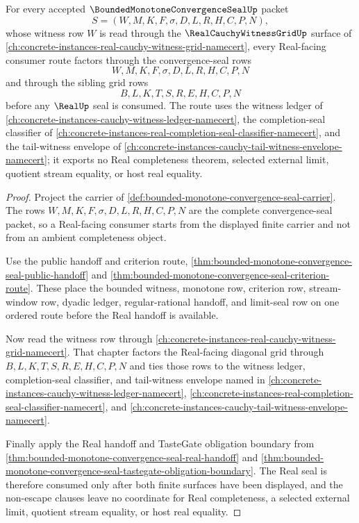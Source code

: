 \begin{theorem}
\label{thm:bounded-monotone-convergence-seal-witness-grid-factorization}
For every accepted $\BoundedMonotoneConvergenceSealUp$ packet
$$
S=(W,M,K,F,\sigma,D,L,R,H,C,P,N),
$$
whose witness row $W$ is read through the $\RealCauchyWitnessGridUp$ surface of \autoref{ch:concrete-instances-real-cauchy-witness-grid-namecert}, every Real-facing consumer route factors through the convergence-seal rows
$$
W,M,K,F,\sigma,D,L,R,H,C,P,N
$$
and through the sibling grid rows
$$
B,L,K,T,S,R,E,H,C,P,N
$$
before any $\RealUp$ seal is consumed. The route uses the witness ledger of \autoref{ch:concrete-instances-cauchy-witness-ledger-namecert}, the completion-seal classifier of \autoref{ch:concrete-instances-real-completion-seal-classifier-namecert}, and the tail-witness envelope of \autoref{ch:concrete-instances-cauchy-tail-witness-envelope-namecert}; it exports no Real completeness theorem, selected external limit, quotient stream equality, or host real equality.
\end{theorem}
\begin{proof}
Project the carrier of \autoref{def:bounded-monotone-convergence-seal-carrier}. The rows $W,M,K,F,\sigma,D,L,R,H,C,P,N$ are the complete convergence-seal packet, so a Real-facing consumer starts from the displayed finite carrier and not from an ambient completeness object.

Use the public handoff and criterion route, \autoref{thm:bounded-monotone-convergence-seal-public-handoff} and \autoref{thm:bounded-monotone-convergence-seal-criterion-route}. These place the bounded witness, monotone row, criterion row, stream-window row, dyadic ledger, regular-rational handoff, and limit-seal row on one ordered route before the Real handoff is available.

Now read the witness row through \autoref{ch:concrete-instances-real-cauchy-witness-grid-namecert}. That chapter factors the Real-facing diagonal grid through $B,L,K,T,S,R,E,H,C,P,N$ and ties those rows to the witness ledger, completion-seal classifier, and tail-witness envelope named in \autoref{ch:concrete-instances-cauchy-witness-ledger-namecert}, \autoref{ch:concrete-instances-real-completion-seal-classifier-namecert}, and \autoref{ch:concrete-instances-cauchy-tail-witness-envelope-namecert}.

Finally apply the Real handoff and TasteGate obligation boundary from \autoref{thm:bounded-monotone-convergence-seal-real-handoff} and \autoref{thm:bounded-monotone-convergence-seal-tastegate-obligation-boundary}. The Real seal is therefore consumed only after both finite surfaces have been displayed, and the non-escape clauses leave no coordinate for Real completeness, a selected external limit, quotient stream equality, or host real equality.
\end{proof}

